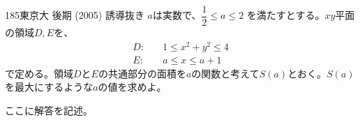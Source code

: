 \begin{prob}{185}{}{東京大 後期 (2005) 誘導抜き}
 $a$は実数で、$\dfrac{1}{2}\le a\le 2$ を満たすとする。$xy$平面の領域$D, E$を、
 \begin{align*}
  D:&\quad 1\le x^2+y^2 \le 4 \\
  E:&\quad a\le x \le a+1
 \end{align*}
 で定める。領域$D$と$E$の共通部分の面積を$a$の関数と考えて$S(a)$とおく。$S(a)$を最大にするような$a$の値を求めよ。
\end{prob}
ここに解答を記述。